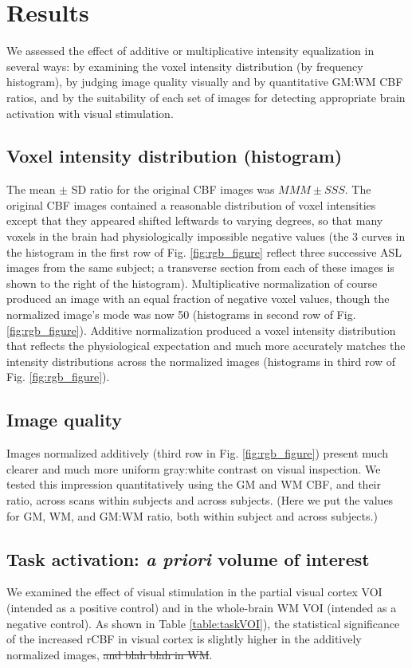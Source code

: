 \section{Results}
We assessed the effect of additive or multiplicative intensity equalization in several ways: by examining the voxel intensity distribution (by frequency histogram), by judging image quality visually and by quantitative GM:WM CBF ratios, and by the suitability of each set of images for detecting appropriate brain activation with visual stimulation.

\subsection{Voxel intensity distribution (histogram)}
The mean $\pm$ SD ratio for the original CBF images was $MMM \pm SSS$. The original CBF images contained a reasonable distribution of voxel intensities except that they appeared shifted leftwards to varying degrees, so that many voxels in the brain had physiologically impossible negative values (the 3 curves in the histogram in the first row of Fig. \ref{fig:rgb_figure} reflect three successive ASL images from the same subject; a transverse section from each of these images is shown to the right of the histogram). Multiplicative normalization of course produced an image with an equal fraction of negative voxel values, though the normalized image's mode was now 50 (histograms in second row of Fig. \ref{fig:rgb_figure}). Additive normalization produced a voxel intensity distribution that reflects the physiological expectation and much more accurately matches the intensity distributions across the normalized images (histograms in third row of Fig. \ref{fig:rgb_figure}). 

\subsection{Image quality}
Images normalized additively (third row in Fig. \ref{fig:rgb_figure}) present much clearer and much more uniform gray:white contrast on visual inspection. We tested this impression quantitatively using the GM and WM CBF, and their ratio, across scans within subjects and across subjects. (Here we put the values for GM, WM, and GM:WM ratio, both within subject and across subjects.)

\subsection{Task activation: \textit{a priori} volume of interest}
We examined the effect of visual stimulation in the partial visual cortex VOI (intended as a positive control) and in the whole-brain WM VOI (intended as a negative control). As shown in Table \ref{table:taskVOI}), the statistical significance of the increased rCBF in visual cortex is slightly higher in the additively normalized images, \sout{and blah blah in WM}.

